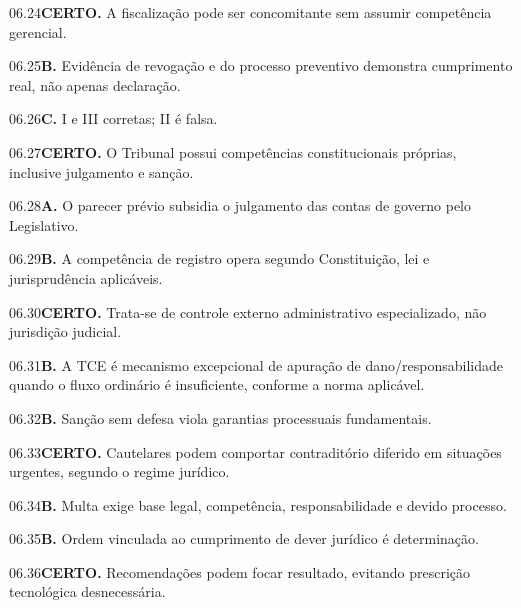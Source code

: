 \begin{solucao}{06.24}\textbf{CERTO.} A fiscalização pode ser concomitante sem assumir competência gerencial.\end{solucao}
\begin{solucao}{06.25}\textbf{B.} Evidência de revogação e do processo preventivo demonstra cumprimento real, não apenas declaração.\end{solucao}
\begin{solucao}{06.26}\textbf{C.} I e III corretas; II é falsa.\end{solucao}
\begin{solucao}{06.27}\textbf{CERTO.} O Tribunal possui competências constitucionais próprias, inclusive julgamento e sanção.\end{solucao}
\begin{solucao}{06.28}\textbf{A.} O parecer prévio subsidia o julgamento das contas de governo pelo Legislativo.\end{solucao}
\begin{solucao}{06.29}\textbf{B.} A competência de registro opera segundo Constituição, lei e jurisprudência aplicáveis.\end{solucao}
\begin{solucao}{06.30}\textbf{CERTO.} Trata-se de controle externo administrativo especializado, não jurisdição judicial.\end{solucao}
\begin{solucao}{06.31}\textbf{B.} A TCE é mecanismo excepcional de apuração de dano/responsabilidade quando o fluxo ordinário é insuficiente, conforme a norma aplicável.\end{solucao}
\begin{solucao}{06.32}\textbf{B.} Sanção sem defesa viola garantias processuais fundamentais.\end{solucao}
\begin{solucao}{06.33}\textbf{CERTO.} Cautelares podem comportar contraditório diferido em situações urgentes, segundo o regime jurídico.\end{solucao}
\begin{solucao}{06.34}\textbf{B.} Multa exige base legal, competência, responsabilidade e devido processo.\end{solucao}
\begin{solucao}{06.35}\textbf{B.} Ordem vinculada ao cumprimento de dever jurídico é determinação.\end{solucao}
\begin{solucao}{06.36}\textbf{CERTO.} Recomendações podem focar resultado, evitando prescrição tecnológica desnecessária.\end{solucao}
